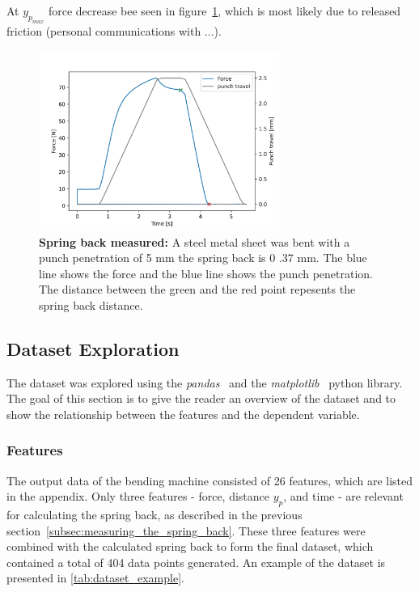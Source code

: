 At $y_p_{max}$ force decrease bee seen in figure~\ref{fig:springback_measured}, which is most
likely due to released friction (personal communications with ...).

\begin{figure}[H]
    \begin{tcolorbox}[arc=0pt,boxrule=0.5pt]
        \centering
        \includegraphics[width=0.7\textwidth]{chap4/images/springback_measured}
    \end{tcolorbox}
    \caption{\textbf{Spring back measured:} A steel metal sheet was bent with a punch penetration of 5
    mm the spring back is 0 .37 mm. The blue line shows the force and the blue line shows the punch penetration.
    The distance between the green and the red point repesents the spring back distance.}
    \label{fig:springback_measured}
\end{figure}

\subsection{Dataset Exploration}\label{subsec:dataset-exploration}
The dataset was explored using the \textit{pandas}~\cite{mckinney-proc-scipy-2010}
and the \textit{matplotlib}~\cite{Hunter:2007} python library.
The goal of this section is to give the reader an overview of the dataset and
to show the relationship between the features and the dependent variable.

\subsubsection{Features}
The output data of the bending machine consisted of 26 features, which are listed in
the appendix.
Only three features - force, distance $y_p$, and time - are relevant for
calculating the spring back, as described in the previous section~\ref{subsec:measuring_the_spring_back}.
These three features were combined with the calculated spring back to form the final
dataset, which contained a total of 404 data points generated.
An example of the dataset is presented in \cref{tab:dataset_example}.

